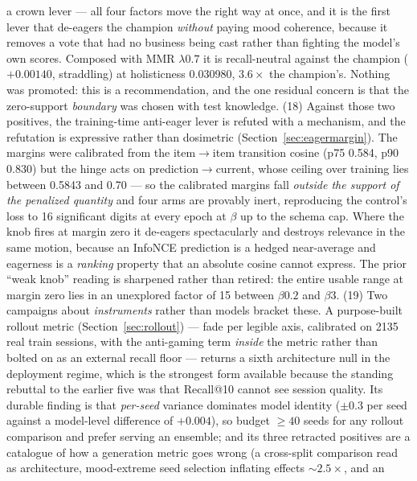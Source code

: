 \documentclass[11pt]{article}
\begin{document}
a crown lever --- all four factors move the right way at once, and it is the first
lever that de-eagers the champion \emph{without} paying mood coherence, because it
removes a vote that had no business being cast rather than fighting the model's own
scores. Composed with MMR $\lambda\num{0.7}$ it is recall-neutral against the
champion ($+\num{0.00140}$, straddling) at holisticness \num{0.030980},
$\num{3.6}\times$ the champion's. Nothing was promoted: this is a recommendation,
and the one residual concern is that the zero-support \emph{boundary} was chosen
with test knowledge.
(18) Against those two positives, the training-time anti-eager lever is refuted
with a mechanism, and the refutation is expressive rather than dosimetric
(Section~\ref{sec:eagermargin}). The margins were calibrated from the
item$\to$item transition cosine (p75 \num{0.584}, p90 \num{0.830}) but the hinge
acts on prediction$\to$current, whose ceiling over training lies between
\num{0.5843} and \num{0.70} --- so the calibrated margins fall \emph{outside the
support of the penalized quantity} and four arms are provably inert, reproducing
the control's loss to \num{16} significant digits at every epoch at $\beta$ up to
the schema cap. Where the knob fires at margin zero it de-eagers spectacularly and
destroys relevance in the same motion, because an InfoNCE prediction is a hedged
near-average and eagerness is a \emph{ranking} property that an absolute cosine
cannot express. The prior ``weak knob'' reading is sharpened rather than retired:
the entire usable range at margin zero lies in an unexplored factor of \num{15}
between $\beta\num{0.2}$ and $\beta\num{3}$.
(19) Two campaigns about \emph{instruments} rather than models bracket these.
A purpose-built rollout metric (Section~\ref{sec:rollout}) --- fade per legible
axis, calibrated on \num{2135} real train sessions, with the anti-gaming term
\emph{inside} the metric rather than bolted on as an external recall floor ---
returns a sixth architecture null in the deployment regime, which is the strongest
form available because the standing rebuttal to the earlier five was that Recall@10
cannot see session quality. Its durable finding is that \emph{per-seed} variance
dominates model identity ($\pm\num{0.3}$ per seed against a model-level difference
of $+\num{0.004}$), so budget $\ge\num{40}$ seeds for any rollout comparison and
prefer serving an ensemble; and its three retracted positives are a catalogue of
how a generation metric goes wrong (a cross-split comparison read as architecture,
mood-extreme seed selection inflating effects ${\sim}\num{2.5}\times$, and an
\end{document}
